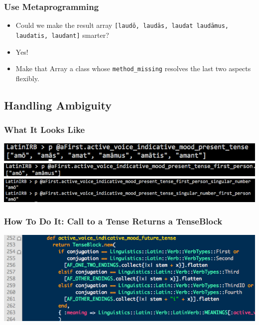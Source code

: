 \documentclass[slidestop,compress,mathserif]{beamer}
\begin{document}
\begin{frame}
	\frametitle{ Use Metaprogramming}
	\begin{itemize}
		\item Could we make the result array \texttt{[laud\={o}, laud\={a}s, laudat laud\={a}mus, laudatis, laudant]} smarter?
		\pause
		\item Yes!
		\pause 
		\item Make that Array a class whose \texttt{method\_missing} resolves the last two aspects flexibly.
	\end{itemize}
\end{frame}


\subsection{Handling Ambiguity} %
\label{sub:methods}

\begin{frame}
	\frametitle{What It Looks Like}

	\includegraphics[scale=0.35]{img/flexibility_1.png}	
	\vskip 0.5cm
	\includegraphics[scale=0.35]{img/flexibility_2.png}	
	\vskip 0.5cm
	\includegraphics[scale=0.30]{img/flexibility_3.png}	
\end{frame}

\begin{frame}
	\frametitle{How To Do It:  Call to a Tense Returns a TenseBlock}
	\begin{center}
		\includegraphics[scale=0.45]{img/tense_method_call.png}
	\end{center}
\end{frame}
\end{document}
